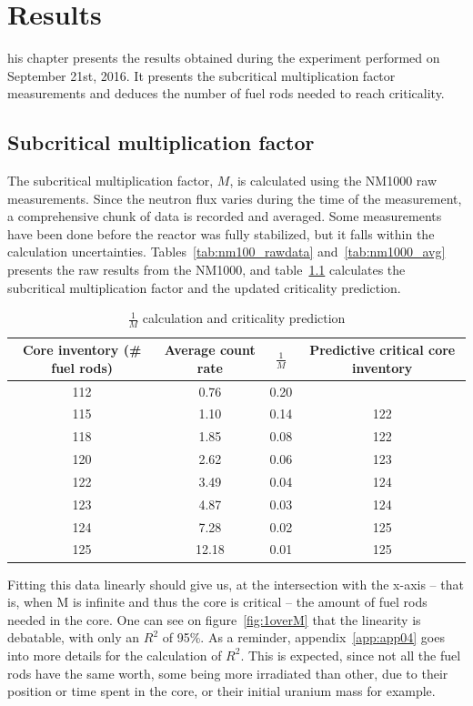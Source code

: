 %
%
\let\textcircled=\pgftextcircled
\chapter{Results}
\label{chap:result}

his chapter presents the results obtained during the experiment performed on September 21st, 2016. It presents the subcritical multiplication factor measurements and deduces the number of fuel rods needed to reach criticality.

\section{Subcritical multiplication factor}

The subcritical multiplication factor, $M$, is calculated using the NM1000 raw measurements. Since the neutron flux varies during the time of the measurement, a comprehensive chunk of data is recorded and averaged. Some measurements have been done before the reactor was fully stabilized, but it falls within the calculation uncertainties. Tables~\ref{tab:nm100_rawdata} and~\ref{tab:nm1000_avg} presents the raw results from the NM1000, and table~\ref{tab:critpred} calculates the subcritical multiplication factor and the updated criticality prediction.

\begin{table}[!htb]
    \centering
    \begin{tabular}{cccc}
        Core inventory (\# fuel rods) & Average count rate & $\frac{1}{M}$ & Predictive critical core inventory \\ \hline\hline
        112 & 0.76  & 0.20 &     \\
        115 & 1.10  & 0.14 & 122 \\
        118 & 1.85  & 0.08 & 122 \\
        120 & 2.62  & 0.06 & 123 \\
        122 & 3.49  & 0.04 & 124 \\
        123 & 4.87  & 0.03 & 124 \\
        124 & 7.28  & 0.02 & 125 \\
        125 & 12.18 & 0.01 & 125
    \end{tabular}
    \caption{$\frac{1}{M}$ calculation and criticality prediction}\label{tab:critpred}
\end{table}

Fitting this data linearly should give us, at the intersection with the x-axis -- that is, when M is infinite and thus the core is critical -- the amount of fuel rods needed in the core. One can see on figure~\ref{fig:1overM} that the linearity is debatable, with only an $R^2$ of 95\%. As a reminder, appendix~\ref{app:app04} goes into more details for the calculation of $R^2$. This is expected, since not all the fuel rods have the same worth, some being more irradiated than other, due to their position or time spent in the core, or their initial uranium mass for example.

